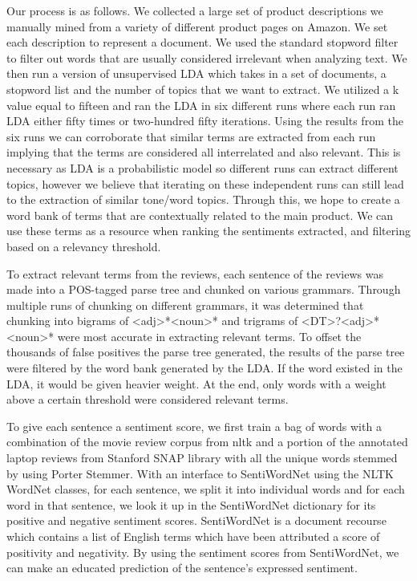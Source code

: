 \documentclass{article}
\begin{document}
Our process is as follows. We collected a large set of product descriptions we manually mined from a variety of different product pages on Amazon. We set each description to represent a document. We used the standard stopword filter to filter out words that are usually considered irrelevant when analyzing text. We then run a version of unsupervised LDA which takes in a set of documents, a stopword list and the number of topics that we want to extract. We utilized a k value equal to fifteen and ran the LDA in six different runs where each run ran LDA either fifty times or two-hundred fifty iterations. Using the results from the six runs we can corroborate that similar terms are extracted from each run implying that the terms are considered all interrelated and also relevant. This is necessary as LDA is a probabilistic model so different runs can extract different topics, however we believe that iterating on these independent runs can still lead to the extraction of similar tone/word topics. Through this, we hope to create a word bank of terms that are contextually related to the main product. We can use these terms as a resource when ranking the sentiments extracted, and filtering based on a relevancy threshold.  

To extract relevant terms from the reviews, each sentence of the reviews was made into a POS-tagged parse tree and chunked on various grammars. Through multiple runs of chunking on different grammars, it was determined that chunking into bigrams of <adj>*<noun>* and trigrams of <DT>?<adj>*<noun>* were most accurate in extracting relevant terms. To offset the thousands of false positives the parse tree generated, the results of the parse tree were filtered by the word bank generated by the LDA. If the word existed in the LDA, it would be given heavier weight. At the end, only words with a weight above a certain threshold were considered relevant terms. 

To give each sentence a sentiment score, we first train a bag of words with a combination of the movie review corpus from nltk and a portion of the annotated laptop reviews from Stanford SNAP library with all the unique words stemmed by using Porter Stemmer. With an interface to SentiWordNet using the NLTK WordNet classes, for each sentence, we split it into individual words and for each word in that sentence, we look it up in the SentiWordNet dictionary for its positive and negative sentiment scores. SentiWordNet is a document recourse which contains a list of English terms which have been attributed a score of positivity and negativity. By using the sentiment scores from SentiWordNet, we can make an educated prediction of the sentence’s expressed sentiment. 
\end{document}
